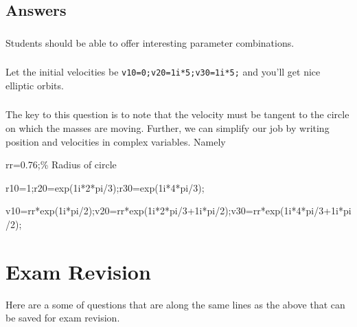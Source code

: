 \documentclass[10pt]{article}
\begin{document}
\begin{Answ}
\subsection{Answers}
\subsubsection{}
Students should be able to offer interesting parameter combinations.
\subsubsection{}
Let the initial velocities be \texttt{v10=0;v20=1i*5;v30=1i*5;} and you'll get nice elliptic orbits.
\subsubsection{}
The key to this question is to note that the velocity must be tangent to the circle on which the masses are moving. Further, we can simplify our job by writing position and velocities in complex variables. Namely

\begin{ttfamily}
rr=0.76;\% Radius of circle

r10=1;r20=exp(1i*2*pi/3);r30=exp(1i*4*pi/3);


v10=rr*exp(1i*pi/2);v20=rr*exp(1i*2*pi/3+1i*pi/2);v30=rr*exp(1i*4*pi/3+1i*pi/2);
\end{ttfamily}
\end{Answ}
\section*{Exam Revision}
Here are a some of questions that are along the same lines as the above that can be saved for exam revision.
\end{document}
